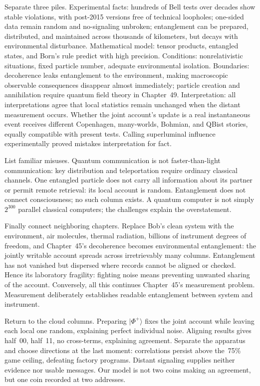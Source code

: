 
Separate three piles. Experimental facts: hundreds of Bell tests over decades show stable violations, with post-2015 versions free of technical loopholes; one-sided data remain random and no-signaling unbroken; entanglement can be prepared, distributed, and maintained across thousands of kilometers, but decays with environmental disturbance. Mathematical model: tensor products, entangled states, and Born's rule predict with high precision. Conditions: nonrelativistic situations, fixed particle number, adequate environmental isolation. Boundaries: decoherence leaks entanglement to the environment, making macroscopic observable consequences disappear almost immediately; particle creation and annihilation require quantum field theory in Chapter~49. Interpretation: all interpretations agree that local statistics remain unchanged when the distant measurement occurs. Whether the joint account's update is a real instantaneous event receives different Copenhagen, many-worlds, Bohmian, and QBist stories, equally compatible with present tests. Calling superluminal influence experimentally proved mistakes interpretation for fact.

List familiar misuses. Quantum communication is not faster-than-light communication: key distribution and teleportation require ordinary classical channels. One entangled particle does not carry all information about its partner or permit remote retrieval: its local account is random. Entanglement does not connect consciousness; no such column exists. A quantum computer is not simply \(2^{300}\) parallel classical computers; the challenges explain the overstatement.

Finally connect neighboring chapters. Replace Bob's clean system with the environment, air molecules, thermal radiation, billions of instrument degrees of freedom, and Chapter~45's decoherence becomes environmental entanglement: the jointly writable account spreads across irretrievably many columns. Entanglement has not vanished but dispersed where records cannot be aligned or checked. Hence its laboratory fragility: fighting noise means preventing unwanted sharing of the account. Conversely, all this continues Chapter~45's measurement problem. Measurement deliberately establishes readable entanglement between system and instrument.


Return to the cloud columns. Preparing \(|\Phi^{+}\rangle\) fixes the joint account while leaving each local one random, explaining perfect individual noise. Aligning results gives half~00, half~11, no cross-terms, explaining agreement. Separate the apparatus and choose directions at the last moment: correlations persist above the~75\% game ceiling, defeating factory programs. Distant signaling supplies neither evidence nor usable messages. Our model is not two coins making an agreement, but one coin recorded at two addresses.

